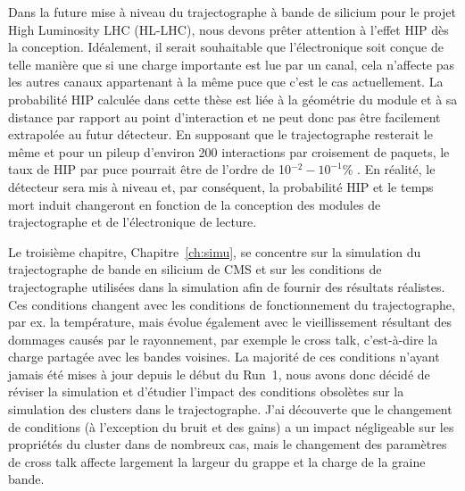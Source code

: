 Dans la future mise à niveau du trajectographe à bande de silicium pour le projet High Luminosity LHC (HL-LHC), nous devons prêter attention à l’effet HIP dès la conception. Idéalement, il serait souhaitable que l’électronique soit conçue de telle manière que si une charge importante est lue par un canal, cela n’affecte pas les autres canaux appartenant à la même puce que c’est le cas actuellement. La probabilité HIP calculée dans cette thèse est liée à la géométrie du module et à sa distance par rapport au point d'interaction et ne peut donc pas être facilement extrapolée au futur détecteur. En supposant que le trajectographe resterait le même et pour un pileup d'environ 200 interactions par croisement de paquets, le taux de HIP par puce pourrait être de l'ordre de 10$^{-2}-10 ^{-1}$\% . En réalité, le détecteur sera mis à niveau et, par conséquent, la probabilité HIP et le temps mort induit changeront en fonction de la conception des modules de trajectographe et de l’électronique de lecture.

\vspace*{1cm}




Le troisième chapitre, Chapitre~\ref{ch:simu}, se concentre sur la simulation du trajectographe de bande en silicium de CMS et sur les conditions de trajectographe utilisées dans la simulation afin de fournir des résultats réalistes. Ces conditions changent avec les conditions de fonctionnement du trajectographe, par ex. la température, mais évolue également avec le vieillissement résultant des dommages causés par le rayonnement, par exemple le cross talk, c'est-à-dire la charge partagée avec les bandes voisines. La majorité de ces conditions n’ayant jamais été mises à jour depuis le début du Run~1, nous avons donc décidé de réviser la simulation et d’étudier l’impact des conditions obsolètes sur la simulation des clusters dans le trajectographe. J'ai découverte que le changement de conditions (à l'exception du bruit et des gains) a un impact négligeable sur les propriétés du cluster dans de nombreux cas, mais le changement des paramètres de cross talk affecte largement la largeur du grappe et la charge de la graine bande.

